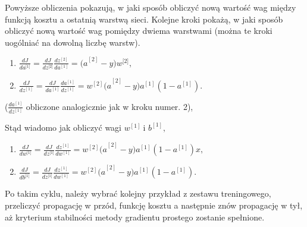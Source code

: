 Powyższe obliczenia pokazują, w jaki sposób obliczyć nową wartość wag między funkcją kosztu a ostatnią warstwą sieci. Kolejne kroki pokażą, w jaki sposób obliczyć nową wartość wag pomiędzy dwiema warstwami (można te kroki uogólniać na dowolną liczbę warstw).

\begin{enumerate}
\def\labelenumi{\arabic{enumi}.}
\setcounter{enumi}{5}
\item
    \(\frac{dJ}{da^{\lbrack 1\rbrack}} = \frac{dJ}{dz^{\lbrack 2\rbrack}} \frac{dz^{\left\lbrack 2 \right\rbrack}}{da^{\left\lbrack 1 \right\rbrack}} = {(a}^{\left\lbrack 2 \right\rbrack} - y) w^{\lbrack 2\rbrack},\)
\item
    \(\frac{dJ}{dz^{\left\lbrack 1 \right\rbrack}} = \frac{dJ}{da^{\left\lbrack 1 \right\rbrack}} \frac{da^{\left\lbrack 1 \right\rbrack}}{dz^{\left\lbrack 1 \right\rbrack}} = {w^{\left\lbrack 2 \right\rbrack}(a}^{\left\lbrack 2 \right\rbrack} - y){a}^{\left\lbrack 1 \right\rbrack}(1 - a^{\left\lbrack 1 \right\rbrack}).\)
\end{enumerate}

(\(\frac{da^{\left\lbrack 1 \right\rbrack}}{dz^{\left\lbrack 1 \right\rbrack}}\)
obliczone analogicznie jak w kroku numer. 2),

Stąd wiadomo jak obliczyć wagi \(w^{\left\lbrack 1 \right\rbrack}\ \)i
\(b^{\left\lbrack 1 \right\rbrack},\)

\begin{enumerate}
\def\labelenumi{\arabic{enumi}.}
\setcounter{enumi}{7}
\item
  \(\frac{dJ}{dw^{\lbrack 1\rbrack}} = \frac{dJ}{dz^{\lbrack 1\rbrack}} \frac{dz^{\left\lbrack 1 \right\rbrack}}{dw^{\left\lbrack 1 \right\rbrack}} = {w^{\left\lbrack 2 \right\rbrack}(a}^{\left\lbrack 2 \right\rbrack} - y){a}^{\left\lbrack 1 \right\rbrack}(1 - a^{\left\lbrack 1 \right\rbrack}) x,\)
\item
  \(\frac{dJ}{db^{\lbrack 1\rbrack}} = \frac{dJ}{dz^{\lbrack 1\rbrack}} \frac{dz^{\left\lbrack 1 \right\rbrack}}{dw^{\left\lbrack 1 \right\rbrack}} = {w^{\left\lbrack 2 \right\rbrack}(a}^{\left\lbrack 2 \right\rbrack} - y){a}^{\left\lbrack 1 \right\rbrack}(1 - a^{\left\lbrack 1 \right\rbrack}).\)
\end{enumerate}

Po takim cyklu, należy wybrać kolejny przykład z zestawu treningowego, przeliczyć propagację w przód, funkcję kosztu a następnie znów propagację w tył, aż kryterium stabilności metody gradientu prostego zostanie spełnione.

